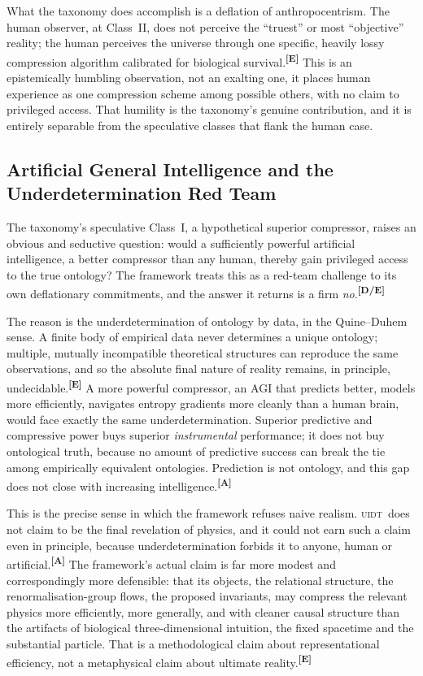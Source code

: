 \documentclass[12pt,a4paper,twoside]{article}
\theoremstyle{plain}
\theoremstyle{definition}
\theoremstyle{remark}
\newcommand{\UIDT}{\textsc{uidt}}
\newcommand{\catmark}[1]{\textsuperscript{\textsf{\textbf{[#1]}}}}
\begin{document}
What the taxonomy does accomplish is a deflation of anthropocentrism. The human observer, at Class~II, does not perceive the ``truest'' or most ``objective'' reality; the human perceives the universe through one specific, heavily lossy compression algorithm calibrated for biological survival.\catmark{E} This is an epistemically humbling observation, not an exalting one, it places human experience as one compression scheme among possible others, with no claim to privileged access. That humility is the taxonomy's genuine contribution, and it is entirely separable from the speculative classes that flank the human case.

\subsection{Artificial General Intelligence and the Underdetermination Red Team}
\label{subsec:agi-underdetermination}

The taxonomy's speculative Class~I, a hypothetical superior compressor, raises an obvious and seductive question: would a sufficiently powerful artificial intelligence, a better compressor than any human, thereby gain privileged access to the true ontology? The framework treats this as a red-team challenge to its own deflationary commitments, and the answer it returns is a firm \emph{no}.\catmark{D/E}

The reason is the underdetermination of ontology by data, in the Quine--Duhem sense. A finite body of empirical data never determines a unique ontology; multiple, mutually incompatible theoretical structures can reproduce the same observations, and so the absolute final nature of reality remains, in principle, undecidable.\catmark{E} A more powerful compressor, an AGI that predicts better, models more efficiently, navigates entropy gradients more cleanly than a human brain, would face exactly the same underdetermination. Superior predictive and compressive power buys superior \emph{instrumental} performance; it does not buy ontological truth, because no amount of predictive success can break the tie among empirically equivalent ontologies. Prediction is not ontology, and this gap does not close with increasing intelligence.\catmark{A}

This is the precise sense in which the framework refuses naive realism. \UIDT\ does not claim to be the final revelation of physics, and it could not earn such a claim even in principle, because underdetermination forbids it to anyone, human or artificial.\catmark{A} The framework's actual claim is far more modest and correspondingly more defensible: that its objects, the relational structure, the renormalisation-group flows, the proposed invariants, may compress the relevant physics more efficiently, more generally, and with cleaner causal structure than the artifacts of biological three-dimensional intuition, the fixed spacetime and the substantial particle. That is a methodological claim about representational efficiency, not a metaphysical claim about ultimate reality.\catmark{E}
\end{document}
